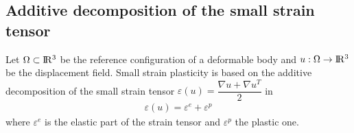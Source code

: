 \documentclass[a4paper,11pt,english]{sphinxmanual}
\begin{document}
\subsection{Additive decomposition of the small strain tensor}
\label{\detokenize{userdoc/model_plasticity_small_strain:additive-decomposition-of-the-small-strain-tensor}}
Let \(\Omega \subset \rm I\hspace{-0.15em}R^3\) be the reference configuration of a deformable body and \(u : \Omega \rightarrow \rm I\hspace{-0.15em}R^3\) be the displacement field. Small strain plasticity is based on the additive decomposition of the small strain tensor \(\varepsilon(u) = \dfrac{\nabla u + \nabla u^T}{2}\) in
\begin{equation*}
\begin{split}\varepsilon(u) = \varepsilon^e + \varepsilon^p\end{split}
\end{equation*}
where \(\varepsilon^e\) is the elastic part of the strain tensor and \(\varepsilon^p\) the plastic one.
\end{document}

